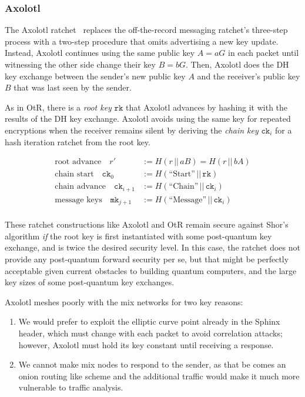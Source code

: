 \documentclass[twoside,letterpaper]{llncs}
\def\mathcomma{}
\begin{document}
\subsubsection{Axolotl}
\def\ck{\texttt{ck}}
\def\rk{\texttt{rk}}
\def\mk{\texttt{mk}}

The Axolotl ratchet~\cite{TextSecure} replaces the off-the-record
messaging ratchet's three-step process with a two-step procedure
that omits advertising a new key update.  Instead, Axolotl continues
using the same public key $A = a G$ in each packet until witnessing
the other side change their key $B = b G$.  Then, Axolotl does the DH key
exchange between the sender's new public key $A$ and the receiver's
public key $B$ that was last seen by the sender.

As in OtR, there is a {\it root key} $\rk$ that Axolotl advances by
hashing it with the results of the DH key exchange.  Axolotl avoids using the same key for
repeated encryptions when the receiver remains silent by deriving the
{\it chain key} $\ck_i$ for a hash iteration ratchet from the root key.

\[ \begin{aligned}
\textrm{root advance}\quad
r' &:= H(r \,||\, a B) = H(r \,||\, b A) \\ %
\textrm{chain start}\quad
 \ck_0 &:= H(\textrm{``Start''} \,||\, \rk) \\
\textrm{chain advance}\quad
 \ck_{i+1} &:= H(\textrm{``Chain''} \,||\, \ck_i)  \\
\textrm{message keys}\quad
 \mk_{j+1} &:= H(\textrm{``Message''} \,||\, \ck_i)  \\
\end{aligned} \]

These ratchet constructions like Axolotl and OtR remain secure against
Shor's algorithm {\it if} the root key is first instantiated with some
post-quantum key exchange, and is twice the desired security level. 
In this case, the ratchet does not provide any post-quantum forward
security per se, but that might be perfectly acceptable given current
obstacles to building quantum computers, and the large key sizes of
some post-quantum key exchanges. 


Axolotl meshes poorly with the mix networks for two key reasons:
\begin{enumerate}
 \item
 We would prefer to exploit the elliptic curve point
 already in the Sphinx header, which must change with each packet
 to avoid correlation attacks; 
 however, Axolotl must hold its key constant until receiving a response.
 \item
 We cannot make mix nodes to respond to the sender, as that
 be comes an onion routing like scheme and the additional traffic
 would make it much more vulnerable to traffic analysis.
\end{enumerate}
\end{document}
